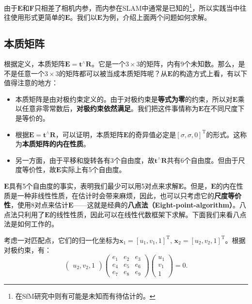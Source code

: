 由于$\bm{E}$和$\bm{F}$只相差了相机内参，而内参在SLAM中通常是已知的\footnote{在SfM研究中则有可能是未知而有待估计的。}，所以实践当中往往使用形式更简单的$\bm{E}$。我们以$\bm{E}$为例，介绍上面两个问题如何求解。

\subsection{本质矩阵}
根据定义，本质矩阵$\bm{E} = \bm{t}^\wedge \bm{R}$。它是一个$3\times 3$的矩阵，内有9个未知数。那么，是不是任意一个$3 \times 3$的矩阵都可以被当成本质矩阵呢？从$\bm{E}$的构造方式上看，有以下值得注意的地方：

\begin{itemize}
	\item 本质矩阵是由对极约束定义的。由于对极约束是\textbf{等式为零}的约束，所以对$\bm{E}$乘以任意非零常数后，\textbf{对极约束依然满足}。我们把这件事情称为$\bm{E}$在不同尺度下是等价的。
	\item 根据$\bm{E} = \bm{t}^ \wedge \bm{R}$，可以证明\textsuperscript{\cite{Hartley2003}}，本质矩阵$\bm{E}$的奇异值必定是$[\sigma, \sigma, 0]^\mathrm{T}$的形式。这称为\textbf{本质矩阵的内在性质}。
	\item 另一方面，由于平移和旋转各有3个自由度，故$\bm{t}^\wedge \bm{R}$共有6个自由度。但由于尺度等价性，故$\bm{E}$实际上有5个自由度。
\end{itemize}

$\bm{E}$具有5个自由度的事实，表明我们最少可以用5对点来求解$\bm{E}$。但是，$\bm{E}$的内在性质是一种非线性性质，在估计时会带来麻烦，因此，也可以只考虑它的\textbf{尺度等价性}，使用8对点来估计$\bm{E}$——这就是经典的\textbf{八点法（Eight-point-algorithm）}\textsuperscript{\cite{Hartley1997, Longuet-Higgins1987}}。八点法只利用了$\bm{E}$的线性性质，因此可以在线性代数框架下求解。下面我们来看八点法是如何工作的。

考虑一对匹配点，它们的归一化坐标为$\bm{x}_{1}=[u_{1},v_{1},1]^\mathrm{T}$, $\bm{x}_{2}=[u_{2},v_{2},1]^{\mathrm{T}}$。根据对极约束，有：
\begin{equation}
\begin{pmatrix} 
u_{2},v_{2},1
\end{pmatrix}
\begin{pmatrix}
 e_{1} & e_{2} & e_{3}\\ 
 e_{4} & e_{5} & e_{6}\\ 
 e_{7} & e_{8} & e_{9} 
\end{pmatrix}
\begin{pmatrix} 
u_{1}\\v_{1}\\1
\end{pmatrix}
=0.
\end{equation}

